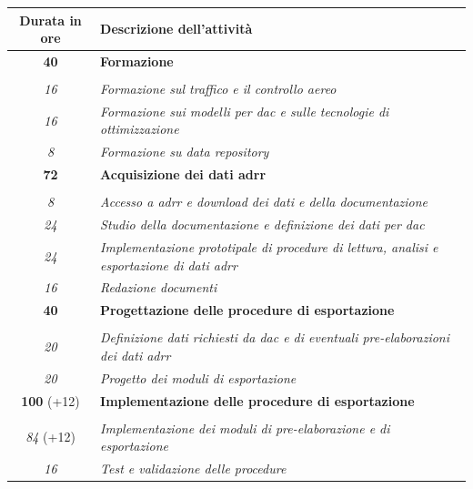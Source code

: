 \begin{table}[H]
\begin{tabularx}{\textwidth}{!{\vrule}c!{\vrule}X!{\vrule}}
	\hline
	\textbf{Durata in ore} & \textbf{Descrizione dell'attività} \\\hline
	
	\textbf{40} & \textbf{Formazione} \\ \hdashline 
    \\ 
    \textit{16} & 
    \textit{Formazione sul traffico e il controllo aereo} \\
    \textit{16} & 
    \textit{Formazione sui modelli per \gls{dac} e sulle tecnologie di ottimizzazione} \\
    \textit{8} & 
    \textit{Formazione su data repository \citet{eurocontrol2025}} \\
    \hline
    
    \textbf{72} & \textbf{Acquisizione dei dati \gls{adrr}}  \\ \hdashline 
    \\ 
    \textit{8} & 
    \textit{Accesso a \gls{adrr} e download dei dati e della documentazione} \\
    \textit{24} & 
    \textit{Studio della documentazione e definizione dei dati per \gls{dac}} \\
    \textit{24} & 
    \textit{Implementazione prototipale di procedure di lettura, analisi e esportazione di dati \gls{adrr}} \\
    \textit{16} & 
    \textit{Redazione documenti} \\
    \hline

    \textbf{40} & \textbf{Progettazione delle procedure di esportazione}  \\ \hdashline 
    \\ 
    \textit{20} & 
    \textit{Definizione dati richiesti da \gls{dac} e di eventuali pre-elaborazioni dei dati \gls{adrr}} \\
    \textit{20} & 
    \textit{Progetto dei moduli di esportazione} \\
    \hline
 
    \textbf{100} (+12) & \textbf{Implementazione delle procedure di esportazione}  \\ \hdashline 
    \\ 
    \textit{84} (+12) & 
    \textit{Implementazione dei moduli di pre-elaborazione e di esportazione} \\
    \textit{16} & 
    \textit{Test e validazione delle procedure} \\
    \hline   


\end{tabularx}
\end{table}
